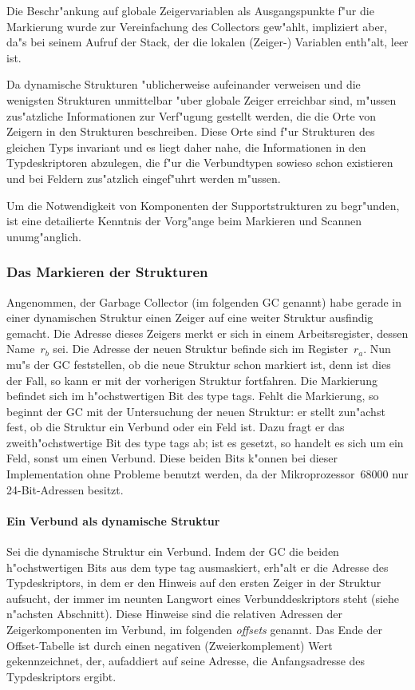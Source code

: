 Die Beschr"ankung auf globale Zeigervariablen als Ausgangspunkte f"ur die Markierung
wurde zur Vereinfachung des Collectors gew"ahlt, impliziert aber, da"s
bei seinem Aufruf der Stack, der die lokalen (Zeiger-) Variablen enth"alt,
leer ist.

Da dynamische Strukturen "ublicherweise aufeinander verweisen und die wenigsten
Strukturen unmittelbar "uber globale Zeiger erreichbar sind, m"ussen
zus"atzliche Informationen zur Verf"ugung gestellt werden, die
die Orte von Zeigern in den Strukturen beschreiben.
Diese Orte sind f"ur Strukturen des gleichen Typs invariant und es liegt daher
nahe, die Informationen in den Typdeskriptoren abzulegen, die f"ur die
Verbundtypen sowieso schon existieren und bei Feldern zus"atzlich eingef"uhrt
werden m"ussen.

Um die Notwendigkeit von Komponenten der Supportstrukturen zu begr"unden,
ist eine detailierte Kenntnis der Vorg"ange beim Markieren und Scannen
unumg"anglich.

\subsubsection{Das Markieren der Strukturen}
\label{Markieren}

Angenommen, der Garbage Collector (im folgenden GC genannt) habe gerade
in einer dynamischen Struktur einen Zeiger auf eine weiter Struktur
ausfindig gemacht.
Die Adresse dieses Zeigers merkt er sich in einem Arbeitsregister, dessen
Name~$r_b$ sei.
Die Adresse der neuen Struktur befinde sich im Register~$r_a$.
Nun mu"s der GC feststellen, ob die neue Struktur schon markiert ist, denn
ist dies der Fall, so kann er mit der vorherigen Struktur fortfahren.
Die Markierung befindet sich im h"ochstwertigen Bit des type tags.
Fehlt die Markierung, so beginnt der GC mit der Untersuchung der neuen
Struktur:
er stellt zun"achst fest, ob die Struktur ein Verbund oder ein Feld ist.
Dazu fragt er das zweith"ochstwertige Bit des type tags ab; ist es gesetzt,
so handelt es sich um ein Feld, sonst um einen Verbund.
Diese beiden Bits k"onnen bei dieser Implementation ohne Probleme benutzt
werden, da der Mikroprozessor~68000 nur 24-Bit-Adressen besitzt.

\paragraph{Ein Verbund als dynamische Struktur}

Sei die dynamische Struktur ein Verbund.
Indem der GC die beiden h"ochstwertigen Bits aus dem type tag ausmaskiert,
erh"alt er die Adresse des Typdeskriptors, in dem er den Hinweis auf
den ersten Zeiger in der Struktur aufsucht, der immer im neunten Langwort
eines Verbunddeskriptors steht (siehe n"achsten Abschnitt).
Diese Hinweise sind die relativen Adressen der Zeigerkomponenten im Verbund,
im folgenden {\it offsets\/} genannt.
Das Ende der Offset-Tabelle ist durch einen negativen (Zweierkomplement) Wert
gekennzeichnet, der, aufaddiert auf seine Adresse, die Anfangsadresse des
Typdeskriptors ergibt.

